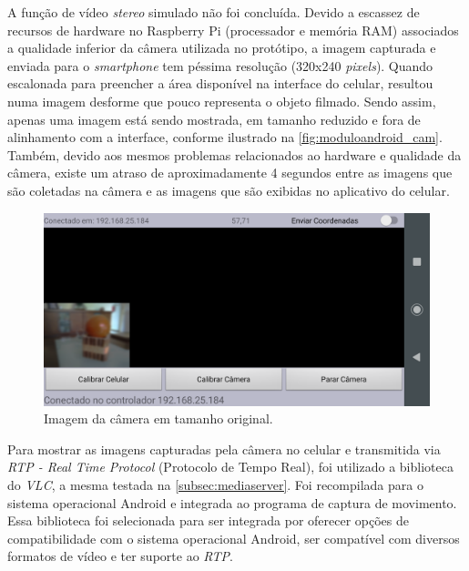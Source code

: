 A função de vídeo \textit{stereo} simulado não foi concluída. Devido a escassez de recursos de hardware no Raspberry Pi (processador e memória RAM) associados a qualidade inferior da câmera utilizada no protótipo, a imagem capturada e enviada para o \textit{smartphone} tem péssima resolução (320x240 \textit{pixels}). Quando escalonada para preencher a área disponível na interface do celular, resultou numa imagem desforme que pouco representa o objeto filmado. Sendo assim, apenas uma imagem está sendo mostrada, em tamanho reduzido e fora de alinhamento com a interface, conforme ilustrado na \autoref{fig:moduloandroid_cam}. Também, devido aos mesmos problemas relacionados ao hardware e qualidade da câmera, existe um atraso de aproximadamente 4 segundos entre as imagens que são coletadas na câmera e as imagens que são exibidas no aplicativo do celular.

\begin{figure}[H]
	\centering
	\includegraphics[width=1\textwidth]{figuras/modulo_android_2.png}
	\caption{Imagem da câmera em tamanho original.}
	\label{fig:moduloandroid_cam}
\end{figure}

Para mostrar as imagens capturadas pela câmera no celular e transmitida via \textit{RTP - Real Time Protocol} (Protocolo de Tempo Real), foi utilizado a biblioteca do \textit{VLC}, a mesma testada na \autoref{subsec:mediaserver}. Foi recompilada para o sistema operacional Android e integrada ao programa de captura de movimento. Essa biblioteca foi selecionada para ser integrada por oferecer opções de compatibilidade com o sistema operacional Android, ser compatível com diversos formatos de vídeo e ter suporte ao \textit{RTP}.